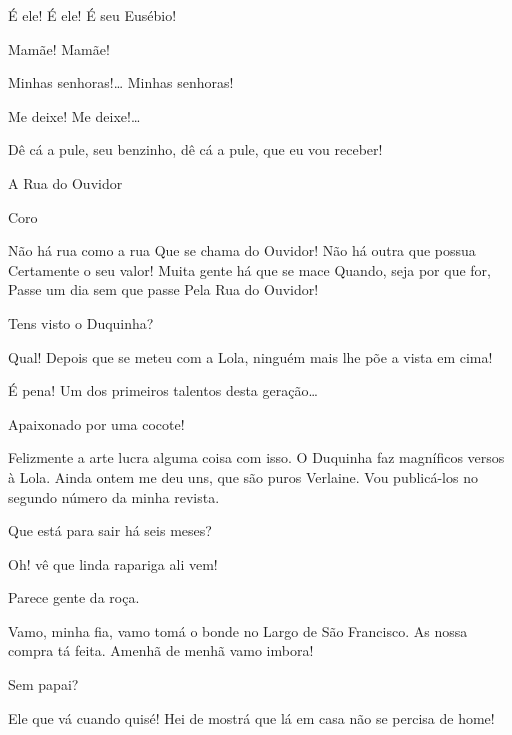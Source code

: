   É ele! É ele! É seu Eusébio! 

  Mamãe! Mamãe! 

  Minhas senhoras!\ldots{} Minhas senhoras! 

  Me 
deixe! Me deixe!\ldots{} 

  Dê cá a pule, seu benzinho, dê cá a pule, que eu
vou receber! 


A Rua do Ouvidor


 Coro

 Não há rua como a rua 
 Que se chama do Ouvidor! 
 Não há outra que possua 
 Certamente o seu valor! 
 Muita gente há que se mace 
 Quando, seja por que for, 
 Passe um dia sem que passe 
 Pela Rua do Ouvidor!

 Tens visto o Duquinha?

 Qual! Depois que se meteu com a Lola, ninguém mais lhe põe a
vista em cima!

 É pena! Um dos primeiros talentos desta geração\ldots{}

 Apaixonado por uma cocote!

 Felizmente a arte lucra alguma coisa com isso. O Duquinha faz 
magníficos versos à Lola. Ainda ontem me deu uns, que são puros Verlaine. Vou
publicá-los no segundo número da minha revista.

 Que está para sair há seis meses?

 Oh! vê que linda rapariga ali vem!

 Parece gente da roça. 

 Vamo, minha fia, vamo tomá o bonde no Largo de São Francisco.
As nossa compra tá feita. Amenhã de menhã vamo imbora!

 Sem papai?

 Ele que vá cuando quisé! Hei de mostrá que lá em casa não se
percisa de home!


